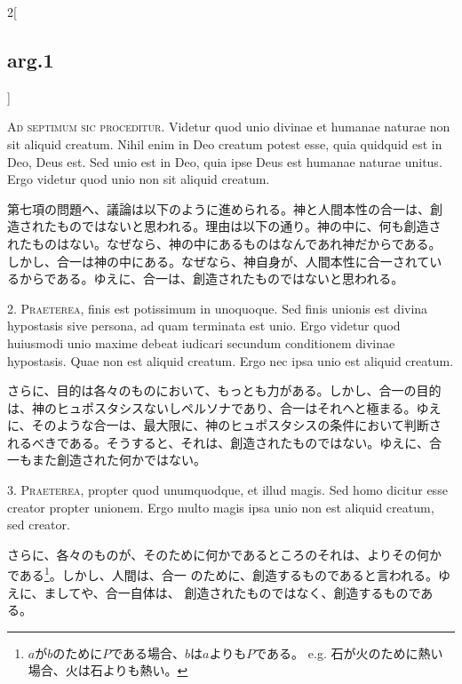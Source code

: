 \documentclass[paper=a4paper,fontsize=10pt,jafontsize=9pt,titlepage]{jlreq}
\begin{document}
\begin{paracol}{2}[\subsection{arg.1}]

{\Huge A}{\scshape d septimum sic proceditur}. Videtur quod unio
divinae et humanae naturae non sit aliquid creatum. Nihil enim in Deo
creatum potest esse, quia quidquid est in Deo, Deus est. Sed unio est
in Deo, quia ipse Deus est humanae naturae unitus. Ergo videtur quod
unio non sit aliquid creatum.

\switchcolumn

第七項の問題へ、議論は以下のように進められる。神と人間本性の合一は、創
造されたものではないと思われる。理由は以下の通り。神の中に、何も創造さ
れたものはない。なぜなら、神の中にあるものはなんであれ神だからである。
しかし、合一は神の中にある。なぜなら、神自身が、人間本性に合一されてい
るからである。ゆえに、合一は、創造されたものではないと思われる。


2. {\scshape Praeterea}, finis est potissimum in unoquoque. Sed finis
unionis est divina hypostasis sive persona, ad quam terminata est
unio. Ergo videtur quod huiusmodi unio maxime debeat iudicari secundum
conditionem divinae hypostasis. Quae non est aliquid creatum. Ergo nec
ipsa unio est aliquid creatum.

\switchcolumn

さらに、目的は各々のものにおいて、もっとも力がある。しかし、合一の目的
は、神のヒュポスタシスないしペルソナであり、合一はそれへと極まる。ゆえ
に、そのような合一は、最大限に、神のヒュポスタシスの条件において判断さ
れるべきである。そうすると、それは、創造されたものではない。ゆえに、合
一もまた創造された何かではない。


3. {\scshape Praeterea}, propter quod unumquodque, et illud magis. Sed
homo dicitur esse creator propter unionem. Ergo multo magis ipsa unio
non est aliquid creatum, sed creator.

\switchcolumn

さらに、各々のものが、そのために何かであるところのそれは、よりその何か
である\footnote{$a$が$b$のために$P$である場合、$b$は$a$よりも$P$である。
e.g. 石が火のために熱い場合、火は石よりも熱い。}。しかし、人間は、合一
のために、創造するものであると言われる。ゆえに、ましてや、合一自体は、
創造されたものではなく、創造するものである。


\end{paracol}
\end{document}

